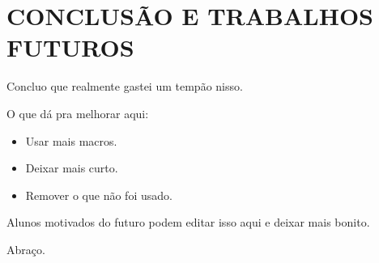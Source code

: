 \chapter{CONCLUSÃO E TRABALHOS FUTUROS}
\label{chapter:conclusao}

Concluo que realmente gastei um tempão nisso.

O que dá pra melhorar aqui: 
\begin{itemize}
    \item Usar mais macros.
    \item Deixar mais curto.
    \item Remover o que não foi usado.
\end{itemize}

Alunos motivados do futuro podem editar isso aqui e deixar mais bonito.

Abraço.
